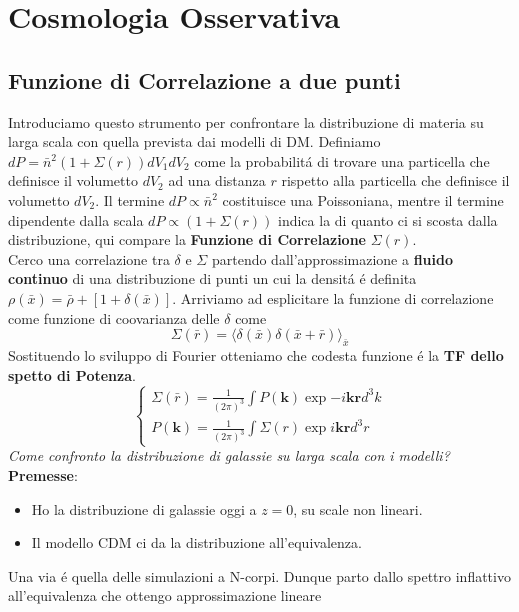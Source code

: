 \documentclass[12pt, a4paper]{article}
\begin{document}
\section{Cosmologia Osservativa}
\subsection{Funzione di Correlazione a due punti}
Introduciamo questo strumento per confrontare la distribuzione di materia su larga scala con quella prevista dai modelli di DM. Definiamo $dP=\boxed{\bar{n}^2}\boxed{(1+\Sigma(r))}dV_1 dV_2$ come la probabilit\'{a} di trovare una particella che definisce il volumetto $dV_2$ ad una distanza $r$ rispetto alla particella che definisce il volumetto $dV_2$. Il termine $dP\propto \bar{n}^2$ costituisce una Poissoniana, mentre il termine dipendente dalla scala $dP\propto(1+\Sigma(r))$ indica la di quanto ci si scosta dalla distribuzione, qui compare la \textbf{Funzione di Correlazione} $\Sigma(r)$.\\
Cerco una correlazione tra $\delta$ e $\Sigma$ partendo dall'approssimazione a \textbf{fluido continuo} di una distribuzione di punti un cui la densit\'{a} \'{e} definita $\rho(\bar{x})=\bar{\rho}+ [1+\delta(\bar{x})]$. Arriviamo ad esplicitare la funzione di correlazione come funzione di coovarianza delle $\delta$ come
\begin{equation}
\Sigma(\bar{r})=\langle \delta(\bar{x}) \delta(\bar{x}+\bar{r})\rangle_{\bar{x}}
\end{equation}
Sostituendo lo sviluppo di Fourier otteniamo che codesta funzione \'{e} la \textbf{TF dello spetto di Potenza}.
\begin{equation}
\begin{cases}
\Sigma(\bar{r})=\frac{1}{(2\pi)^3}\int P(\mathbf{k})\exp{-i\mathbf{k}\mathbf{r}}d^3k
\\
P(\mathbf{k})=\frac{1}{(2\pi)^3}\int \Sigma(r)\exp{i\mathbf{k}\mathbf{r}}d^3r
\end{cases}
\end{equation}
\textit{Come confronto la distribuzione di galassie su larga scala con i modelli?}\\
\textbf{Premesse}:
\begin{itemize}
\item Ho la distribuzione di galassie oggi a $z=0$, su scale non lineari.
\item Il modello CDM ci da la distribuzione all'equivalenza.
\end{itemize}
Una via \'{e} quella delle simulazioni a N-corpi. Dunque parto dallo spettro inflattivo all'equivalenza che ottengo approssimazione lineare
\end{document}
